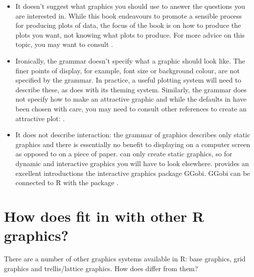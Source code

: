 \begin{itemize}
  \item It doesn't suggest what graphics you should use to answer the questions you are interested in.  While this book endeavours to promote a sensible process for producing plots of data, the focus of the book is on how to produce the plots you want, not knowing what plots to produce. For more advice on this topic, you may want to consult  \citet{robbins:2004,cleveland:1993,chambers:1983,tukey:1977}.

  \item Ironically, the grammar doesn't specify what a graphic should look like.  The finer points of display, for example, font size or background colour, are not specified by the grammar.  In practice, a useful plotting system will need to describe these, as \ggplot does with its theming system. Similarly, the grammar does not specify how to make an attractive graphic and while the defaults in \ggplot have been chosen with care, you may need to consult other references to create an attractive plot: \citet{tufte:1990,tufte:1997,tufte:2001,tufte:2006}.

  \item It does not describe interaction: the grammar of graphics describes only static graphics and there is essentially no benefit to displaying on a computer screen as opposed to on a piece of paper.  \ggplot can only create static graphics, so for dynamic and interactive graphics you will have to look elsewhere.  \citet{cook:2007} provides an excellent introductions the interactive graphics package GGobi.  GGobi can be connected to R with the  package \citep{wickham:2007i}.

\end{itemize}

\section{How does \ggplot fit in with other R graphics?}

There are a number of other graphics systems available in R: base graphics, grid graphics and trellis/lattice graphics.  How does \ggplot differ from them?

